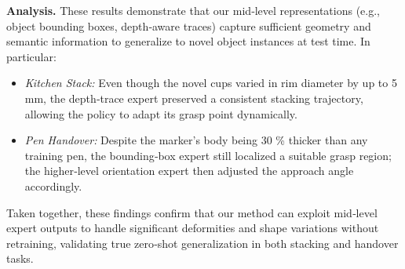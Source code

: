 \documentclass[conference,dvipsnames]{IEEEtran}
\begin{document}
\noindent\textbf{Analysis.} These results demonstrate that our mid‐level representations (e.g., object bounding boxes, depth‐aware traces) capture sufficient geometry and semantic information to generalize to novel object instances at test time. In particular:
\begin{itemize}[leftmargin=10pt, itemsep=2pt]
  \item \emph{Kitchen Stack:} Even though the novel cups varied in rim diameter by up to 5 mm, the depth‐trace expert preserved a consistent stacking trajectory, allowing the policy to adapt its grasp point dynamically.
  \item \emph{Pen Handover:} Despite the marker’s body being 30 \% thicker than any training pen, the bounding‐box expert still localized a suitable grasp region; the higher‐level orientation expert then adjusted the approach angle accordingly.
\end{itemize}


Taken together, these findings confirm that our method can exploit mid‐level expert outputs to handle significant deformities and shape variations without retraining, validating true zero‐shot generalization in both stacking and handover tasks.
\end{document}
